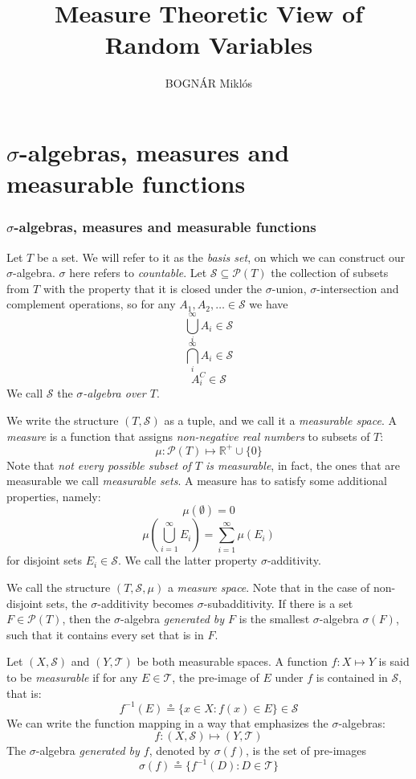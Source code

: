 \documentclass[xcolor=dvipsnames]{beamer}
\author{BOGNÁR Miklós}
\title{Measure Theoretic View of Random Variables}
\begin{document}
\maketitle
\section{$\sigma$-algebras, measures and measurable functions}
\begin{frame}
\frametitle{$\sigma$-algebras, measures and measurable functions}
Let $T$ be a set. We will refer to it as the \emph{basis set}, on which we can construct our $\sigma$-algebra. $\sigma$ here refers to \emph{countable}. Let $\mathcal{S} \subseteq \mathcal{P}(T)$ the collection of subsets from $T$ with the property that it is closed under the $\sigma$-union, $\sigma$-intersection and complement operations, so for any $A_1, A_2, \dots \in \mathcal{S}$ we have
\[
	\bigcup_i^{\infty}{A_i} \in \mathcal{S}
\]
\[
	\bigcap_i^{\infty}{A_i} \in \mathcal{S}
\]
\[
	A_i^C \in \mathcal{S}
\]
We call $\mathcal{S}$ the \emph{$\sigma$-algebra over $T$}.
\end{frame}
\begin{frame}
We write the structure $(T, \mathcal{S})$ as a tuple, and we call it a \emph{measurable space}. A \emph{measure} is a function that assigns \emph{non-negative real numbers} to subsets of $T$:
\[
	\mu: \mathcal{P}(T) \mapsto \mathbb{R}^{+} \cup \{0\} 
\]
Note that \emph{not every possible subset of $T$ is measurable}, in fact, the ones that are measurable we call \emph{measurable sets}. A measure has to satisfy some additional properties, namely:
\[
	\mu(\emptyset) = 0
\]
\[
	\mu(\bigcup_{i=1}^{\infty}{E_i}) = \sum_{i=1}^{\infty}{\mu(E_i)}
\]
for disjoint sets $E_i \in \mathcal{S}$. We call the latter property $\sigma$-additivity.
\end{frame}
\begin{frame}
We call the structure $(T, \mathcal{S}, \mu)$ a \emph{measure space}. Note that in the case of non-disjoint sets, the $\sigma$-additivity becomes $\sigma$-subadditivity. If there is a set $F \in \mathcal{P}(T)$, then the $\sigma$-algebra \emph{generated by $F$} is the smallest $\sigma$-algebra $\sigma(F)$, such that it contains every set that is in $F$.
\end{frame}
\begin{frame}
Let $(X, \mathcal{S})$ and $(Y, \mathcal{T})$ be both measurable spaces. A function $f : X \mapsto Y$ is said to be \emph{measurable} if for any $E \in \mathcal{T}$, the pre-image of $E$ under $f$ is contained in $\mathcal{S}$, that is:
\[
	f^{-1}(E) \circeq \{x \in X : f(x) \in E\} \in \mathcal{S}
\]
We can write the function mapping in a way that emphasizes the $\sigma$-algebras:
\[
	f : (X, \mathcal{S}) \mapsto (Y, \mathcal{T})
\]
The $\sigma$-algebra \emph{generated by $f$}, denoted by $\sigma(f)$, is the set of pre-images
\[
	\sigma(f) \circeq \{f^{-1}(D) : D \in \mathcal{T}\}
\]
\end{frame}
\end{document}
